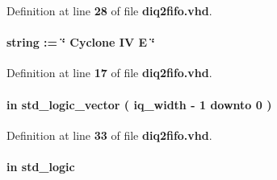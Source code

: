 Definition at line {\bf 28} of file {\bf diq2fifo.\+vhd}.

\paragraph[{dev\+\_\+family}]{ {\bfseries \textcolor{vhdlchar}{ }} {\bfseries \textcolor{comment}{string}\textcolor{vhdlchar}{ }\textcolor{vhdlchar}{ }\textcolor{vhdlchar}{\+:}\textcolor{vhdlchar}{=}\textcolor{vhdlchar}{ }\textcolor{vhdlchar}{ }\textcolor{vhdlchar}{ }\textcolor{vhdlchar}{ }\textcolor{keyword}{\char`\"{} Cyclone I\+V E \char`\"{}}\textcolor{vhdlchar}{ }} \hspace{0.3cm}{\ttfamily [Generic]}}\label{classdiq2fifo_a1314572919959082d23e5f98e64a0ce2}


Definition at line {\bf 17} of file {\bf diq2fifo.\+vhd}.

\paragraph[{D\+IQ}]{ {\bfseries \textcolor{keywordflow}{in}\textcolor{vhdlchar}{ }} {\bfseries \textcolor{comment}{std\+\_\+logic\+\_\+vector}\textcolor{vhdlchar}{ }\textcolor{vhdlchar}{(}\textcolor{vhdlchar}{ }\textcolor{vhdlchar}{ }\textcolor{vhdlchar}{ }\textcolor{vhdlchar}{ }{\bfseries {\bf iq\+\_\+width}} \textcolor{vhdlchar}{-\/}\textcolor{vhdlchar}{ } \textcolor{vhdldigit}{1} \textcolor{vhdlchar}{ }\textcolor{keywordflow}{downto}\textcolor{vhdlchar}{ }\textcolor{vhdlchar}{ } \textcolor{vhdldigit}{0} \textcolor{vhdlchar}{ }\textcolor{vhdlchar}{)}\textcolor{vhdlchar}{ }} \hspace{0.3cm}{\ttfamily [Port]}}\label{classdiq2fifo_a31483b679dfb0ab9de9dc735626cba46}


Definition at line {\bf 33} of file {\bf diq2fifo.\+vhd}.

\paragraph[{fidm}]{ {\bfseries \textcolor{keywordflow}{in}\textcolor{vhdlchar}{ }} {\bfseries \textcolor{comment}{std\+\_\+logic}\textcolor{vhdlchar}{ }} \hspace{0.3cm}{\ttfamily [Port]}}\label{classdiq2fifo_a97ae5ad9eee26d5f984f95d151f62ec0}


